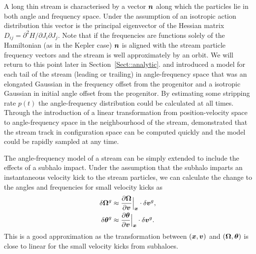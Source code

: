 \documentclass[useAMS,usenatbib,fleqn,a4paper]{mn2e}
\newcommand{\bs}[1]{\bmath{#1}}
\begin{document}
A long thin stream is characterised by a vector $\bs{n}$ along which the particles lie in both angle and frequency space. Under the assumption of an isotropic action distribution this vector is the principal eigenvector of the Hessian matrix $D_{ij}=\partial^2 H/\partial J_i\partial J_j$. Note that if the frequencies are functions solely of the Hamiltonian (as in the Kepler case) $\bs{n}$ is aligned with the stream particle frequency vectors and the stream is well approximately by an orbit. We will return to this point later in Section~\ref{Sect::analytic}. \cite{Bovy2014} and \cite{Sanders2014} introduced a model for each tail of the stream (leading or trailing) in angle-frequency space that was an elongated Gaussian in the frequency offset from the progenitor and a isotropic Gaussian in initial angle offset from the progenitor. By estimating some stripping rate $p(t)$ the angle-frequency distribution could be calculated at all times. Through the introduction of a linear transformation from position-velocity space to angle-frequency space in the neighbourhood of the stream, \cite{Bovy2014} demonstrated that the stream track in configuration space can be computed quickly and the model could be rapidly sampled at any time.

The angle-frequency model of a stream can be simply extended to include the effects of a subhalo impact. Under the assumption that the subhalo imparts an instantaneous velocity kick to the stream particles, we can calculate the change to the angles and frequencies for small velocity kicks as
\begin{equation}\label{eq:kickfreqangle}
\begin{split}
\delta \boldsymbol{\Omega}^g &\approx \frac{\upartial \boldsymbol{\Omega}}{\upartial \bs{v}}\Big|_{\bs{x}}\cdot \delta\bs{v}^g,\\
\delta \bs{\theta}^g &\approx \frac{\upartial \bs{\theta}}{\upartial \bs{v}}\Big|_{\bs{x}}\cdot \delta\bs{v}^g.
\end{split}
\end{equation}
This is a good approximation as the transformation between $(\bs{x},\bs{v})$ and $(\boldsymbol{\Omega},\bs{\theta})$ is close to linear for the small velocity kicks from subhaloes.
\end{document}
